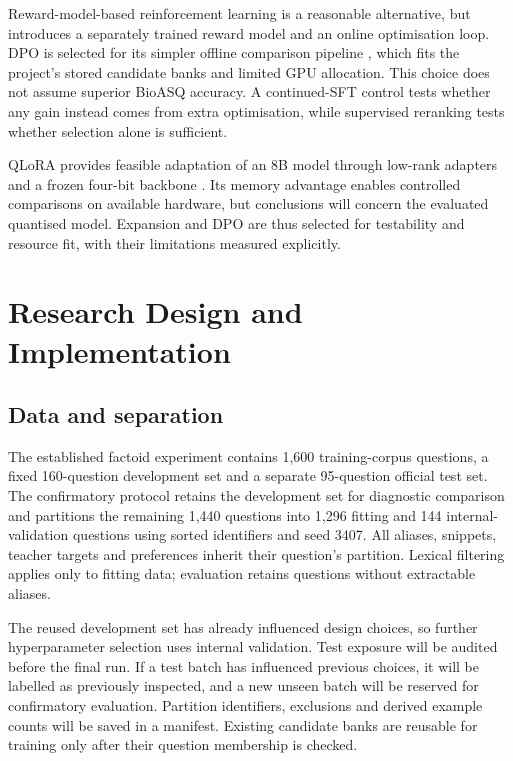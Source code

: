 \documentclass[12pt,a4paper]{article}
\begin{document}
Reward-model-based reinforcement learning is a reasonable alternative, but introduces a separately trained reward model and an online optimisation loop. DPO is selected for its simpler offline comparison pipeline \citep{rafailov2023dpo}, which fits the project's stored candidate banks and limited GPU allocation. This choice does not assume superior BioASQ accuracy. A continued-SFT control tests whether any gain instead comes from extra optimisation, while supervised reranking tests whether selection alone is sufficient.

QLoRA provides feasible adaptation of an 8B model through low-rank adapters and a frozen four-bit backbone \citep{dettmers2023qlora}. Its memory advantage enables controlled comparisons on available hardware, but conclusions will concern the evaluated quantised model. Expansion and DPO are thus selected for testability and resource fit, with their limitations measured explicitly.

\section{Research Design and Implementation}

\subsection{Data and separation}

The established factoid experiment contains 1,600 training-corpus questions, a fixed 160-question development set and a separate 95-question official test set. The confirmatory protocol retains the development set for diagnostic comparison and partitions the remaining 1,440 questions into 1,296 fitting and 144 internal-validation questions using sorted identifiers and seed 3407. All aliases, snippets, teacher targets and preferences inherit their question's partition. Lexical filtering applies only to fitting data; evaluation retains questions without extractable aliases.

The reused development set has already influenced design choices, so further hyperparameter selection uses internal validation. Test exposure will be audited before the final run. If a test batch has influenced previous choices, it will be labelled as previously inspected, and a new unseen batch will be reserved for confirmatory evaluation. Partition identifiers, exclusions and derived example counts will be saved in a manifest. Existing candidate banks are reusable for training only after their question membership is checked.
\end{document}
